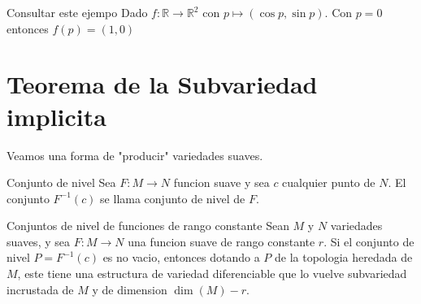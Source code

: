 \begin{bookexample}{Consultar este ejempo}
Dado $f:\mathbb{R}\rightarrow\mathbb{R}^{2}$ con $p\mapsto (\cos p,\sin p)$. Con $p=0$ entonces $f(p)=(1,0)$\\



\end{bookexample}
\label{blk:078822}
\section{Teorema de la Subvariedad implicita}
\begin{bookremark}{}
Veamos una forma de "producir" variedades suaves.

\end{bookremark}
\begin{bookdefinition}{Conjunto de nivel}
Sea $F:M\to N$ funcion suave y sea $c$ cualquier punto de $N$. El conjunto $F^{-1}(c)$ se llama conjunto de nivel de $F$.

\end{bookdefinition}
\begin{booktheorem}{Conjuntos de nivel de funciones de rango constante}
Sean $M$ y $N$ variedades suaves, y sea $F:M\to N$ una funcion suave de rango constante $r$. Si el conjunto de nivel $P=F^{-1}(c)$ es no vacio, entonces dotando a $P$ de la topologia heredada de $M$, este tiene una estructura de variedad diferenciable que lo vuelve subvariedad incrustada de $M$ y de dimension $\dim(M)-r$.

\end{booktheorem}
